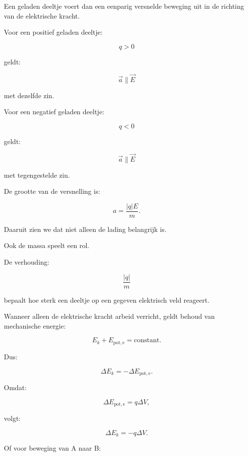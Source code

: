 \documentclass{ximera}
\begin{document}
Een geladen deeltje voert dan een eenparig versnelde beweging uit in
de richting van de elektrische kracht.




Voor een positief geladen deeltje:

\[
q>0
\]

geldt:

\[
\vec a\parallel\vec E
\]

met dezelfde zin.


Voor een negatief geladen deeltje:

\[
q<0
\]

geldt:

\[
\vec a\parallel\vec E
\]

met tegengestelde zin.


De grootte van de versnelling is:

\[
\boxed{
a
=
\frac{|q|E}{m}.
}
\]


Daaruit zien we dat niet alleen de lading belangrijk is.

Ook de massa speelt een rol.

De verhouding:

\[
\boxed{
\frac{|q|}{m}
}
\]

bepaalt hoe sterk een deeltje op een gegeven elektrisch veld reageert.




Wanneer alleen de elektrische kracht arbeid verricht, geldt behoud van
mechanische energie:

\[
E_k+E_{\mathrm{pot,e}}=\text{constant}.
\]

Dus:

\[
\Delta E_k
=
-\Delta E_{\mathrm{pot,e}}.
\]

Omdat:

\[
\Delta E_{\mathrm{pot,e}}
=
q\Delta V,
\]

volgt:

\[
\boxed{
\Delta E_k
=
-q\Delta V.
}
\]

Of voor beweging van A naar B:
\end{document}
